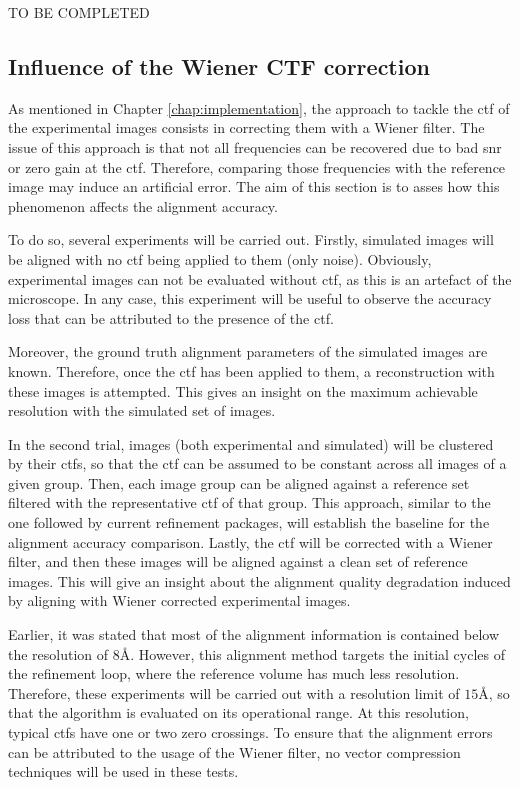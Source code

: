 \documentclass[../main.tex]{subfiles}
\begin{document}
TO BE COMPLETED

\subsection{Influence of the Wiener CTF correction}
As mentioned in Chapter \ref{chap:implementation}, the approach to tackle the \gls{ctf} of the experimental images consists in correcting them with a Wiener filter. The issue of this approach is that not all frequencies can be recovered due to bad \gls{snr} or zero gain at the \gls{ctf}. Therefore, comparing those frequencies with the reference image may induce an artificial error. The aim of this section is to asses how this phenomenon affects the alignment accuracy.

To do so, several experiments will be carried out. Firstly, simulated images will be aligned with no \gls{ctf} being applied to them (only noise). Obviously, experimental images can not be evaluated without \gls{ctf}, as this is an artefact of the microscope. In any case, this experiment will be useful to observe the accuracy loss that can be attributed to the presence of the \gls{ctf}. 

Moreover, the ground truth alignment parameters of the simulated images are known. Therefore, once the \gls{ctf} has been applied to them, a reconstruction with these images is attempted. This gives an insight on the maximum achievable resolution with the simulated set of images. 

In the second trial, images (both experimental and simulated) will be clustered by their \glspl{ctf}, so that the \gls{ctf} can be assumed to be constant across all images of a given group. Then, each image group can be aligned against a reference set filtered with the representative \gls{ctf} of that group. This approach, similar to the one followed by current refinement packages, will establish the baseline for the alignment accuracy comparison. Lastly, the \gls{ctf} will be corrected with a Wiener filter, and then these images will be aligned against a clean set of reference images. This will give an insight about the alignment quality degradation induced by aligning with Wiener corrected experimental images. 

Earlier, it was stated that most of the alignment information is contained below the resolution of $8\si{\angstrom}$. However, this alignment method targets the initial cycles of the refinement loop, where the reference volume has much less resolution. Therefore, these experiments will be carried out with a resolution limit of $15\si{\angstrom}$, so that the algorithm is evaluated on its operational range. At this resolution, typical \glspl{ctf} have one or two zero crossings. To ensure that the alignment errors can be attributed to the usage of the Wiener filter, no vector compression techniques will be used in these tests.
\end{document}
